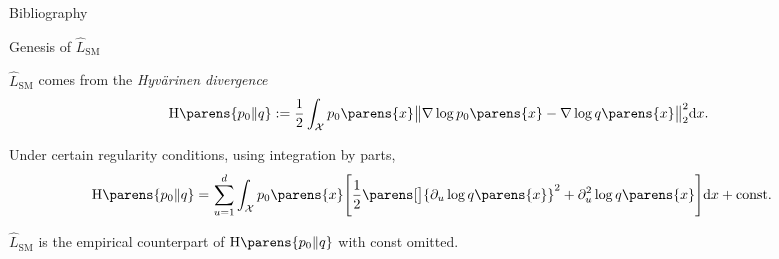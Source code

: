\documentclass[aspectratio=169,xcolor=dvipsnames]{beamer}
\newcommand{\SM}{\mathrm{SM}}
\begin{document}
%	
%
%
%	
%	


\begin{frame}{Bibliography}
	\renewcommand*{\bibfont}{\tiny}
	\printbibliography

\end{frame}

\begin{frame}{Genesis of $\widehat{L}_{\SM}$}

	$\widehat{L}_{\SM}$ comes from the \textit{Hyv{\"a}rinen divergence} \parencite{Hyvarinen2005-wp}
	\begin{align}
		\mathrm{H} \parens{p_0 \Vert q} := \frac{1}{2} \int_{\mathcal{X}} p_0 \parens{x} \big\Vert \nabla \log p_0 \parens{x} - \nabla \log q \parens{x} \big\Vert_2^2 \mathrm{d} x. 
	\end{align}
	
	\vspace{10pt}
	
	Under certain regularity conditions, using integration by parts, 
	\begin{align}
		\mathrm{H} \parens{p_0 \Vert q} 
		= & \, \sum_{u=1}^d \int_{\mathcal{X}} p_0 \parens{x} \Bigg[ \frac{1}{2} \parens[\big]{\partial_u \log q \parens{x}}^2 + \partial_u^2 \log q \parens{x} \Bigg] \mathrm{d} x + \text{const}. %
	\end{align}
	
	$\widehat{L}_{\SM}$ is the empirical counterpart of $\mathrm{H} \parens{p_0 \Vert q}$ with const omitted. 
	
\end{frame}
\end{document}
